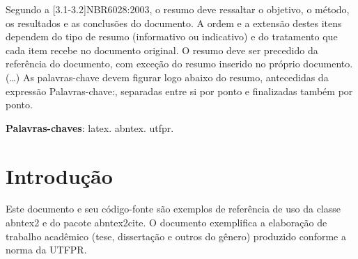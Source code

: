 \documentclass[12pt,openright,oneside,chapter=TITLE,section=TITLE,
	brazil]{utfpr-pg}
\begin{document}
\frenchspacing 
 \pretextual
\imprimircapa
 \imprimirfolhaderosto*

 \begin{resumo}
  Segundo a [3.1-3.2]{NBR6028:2003}, o resumo deve ressaltar o
  objetivo, o método, os resultados e as conclusões do documento. A ordem e a extensão
  destes itens dependem do tipo de resumo (informativo ou indicativo) e do
  tratamento que cada item recebe no documento original. O resumo deve ser
  precedido da referência do documento, com exceção do resumo inserido no
  próprio documento. (\ldots) As palavras-chave devem figurar logo abaixo do
  resumo, antecedidas da expressão Palavras-chave:, separadas entre si por
  ponto e finalizadas também por ponto.

  \vspace{\onelineskip}
    
  \noindent
  \textbf{Palavras-chaves}: latex. abntex. utfpr.
 \end{resumo}



 \chapter{Introdução}

 Este documento e seu código-fonte são exemplos de referência de uso da classe
 \textsf{abntex2} e do pacote \textsf{abntex2cite}. O documento 
 exemplifica a elaboração de trabalho acadêmico (tese, dissertação e outros do
 gênero) produzido conforme a norma da UTFPR.
 
\end{document}
